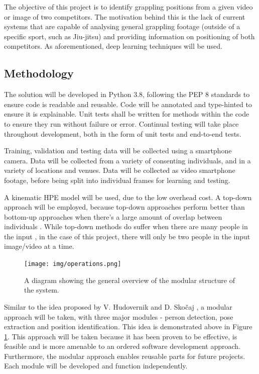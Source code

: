 \documentclass[a4paper, oneside, 11pt]{article}
\begin{document}
The objective of this project is to identify grappling positions from a given video or image of two competitors. The motivation behind this is the lack of current systems that are capable of analysing general grappling footage (outside of a specific sport, such as Jiu-jitsu) and providing information on positioning of both competitors. As aforementioned, deep learning techniques will be used. 

\subsection{Methodology}

The solution will be developed in Python 3.8, following the PEP 8 standards to ensure code is readable and reusable. Code will be annotated and type-hinted to ensure it is explainable. Unit tests shall be written for methods within the code to ensure they run without failure or error. Continual testing will take place throughout development, both in the form of unit tests and end-to-end tests.

Training, validation and testing data will be collected using a smartphone camera. Data will be collected from a variety of consenting individuals, and in a variety of locations and venues. Data will be collected as video smartphone footage, before being split into individual frames for learning and testing.

A kinematic HPE model will be used, due to the low overhead cost. A top-down approach will be employed, because top-down approaches perform better than bottom-up approaches when there's a large amount of overlap between individuals \cite{HPEDeepLearningMethods}. While top-down methods do suffer when there are many people in the input \cite{HPEDeepLearningMethods}, in the case of this project, there will only be two people in the input image/video at a time.

\begin{figure}[ht]
    \centering
    \texttt{[image: img/operations.png]}
    \caption{A diagram showing the general overview of the modular structure of the system.}
    \label{fig:operations}
\end{figure}

Similar to the idea proposed by V. Hudovernik and D. Skočaj \cite{IdentifyingBJJPositions}, a modular approach will be taken, with three major modules - person detection, pose extraction and position identification. This idea is demonstrated above in Figure \ref{fig:operations}. This approach will be taken because it has been proven to be effective, is feasible and is more amenable to an ordered software development approach. Furthermore, the modular approach enables reusable parts for future projects. Each module will be developed and function independently.
\end{document}
